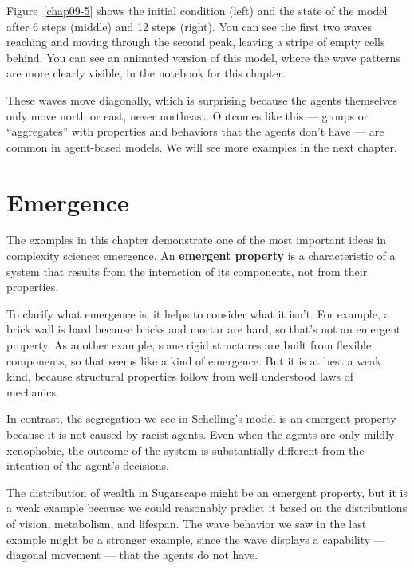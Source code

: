 \documentclass[12pt]{book}
\theoremstyle{exercise}
\begin{document}
Figure~\ref{chap09-5} shows the initial condition (left) and the
state of the model after 6 steps (middle) and 12 steps (right).
You can see the first two waves reaching and moving through the
second peak, leaving a stripe of empty cells behind.  You can
see an animated version of this model, where the wave patterns are
more clearly visible, in the notebook for this chapter.

These waves
move diagonally, which is surprising because the agents
themselves only move north or east, never northeast.  Outcomes
like this --- groups or ``aggregates'' with properties and behaviors
that the agents don't have --- are common in agent-based models.
We will see more examples in the next chapter.


\section{Emergence}

The examples in this chapter demonstrate one of the most important
ideas in complexity science: emergence.  An {\bf emergent property} is
a characteristic of a system that results from the interaction of its
components, not from their properties.


To clarify what emergence is, it helps to consider what it isn't.  For
example, a brick wall is hard because bricks and mortar are hard, so
that's not an emergent property.  As another example, some rigid
structures are built from flexible components, so that seems like a
kind of emergence.  But it is at best a weak kind, because structural
properties follow from well understood laws of mechanics.


In contrast, the segregation we see in Schelling's model is an emergent
property because it is not caused by racist agents.  Even when the
agents are only mildly xenophobic, the outcome of the system is
substantially different from the intention of the agent's decisions.


The distribution of wealth in Sugarscape might be an emergent
property, but it is a weak example because we could
reasonably predict it based on the distributions of vision, metabolism,
and lifespan.  The wave behavior we saw in the last example might
be a stronger example, since the wave displays a capability --- diagonal
movement --- that the agents do not have.
\end{document}
